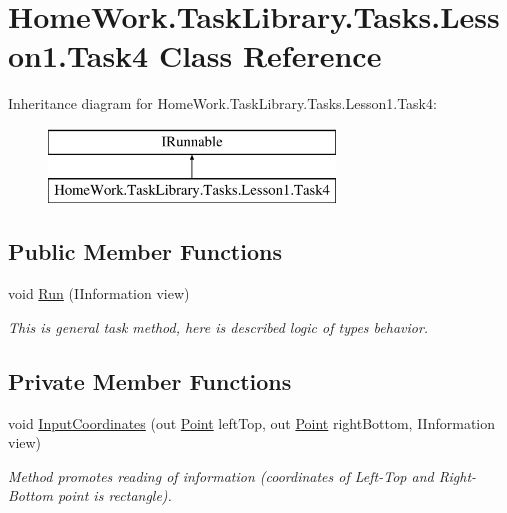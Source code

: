 \hypertarget{class_home_work_1_1_task_library_1_1_tasks_1_1_lesson1_1_1_task4}{}\section{Home\+Work.\+Task\+Library.\+Tasks.\+Lesson1.\+Task4 Class Reference}
\label{class_home_work_1_1_task_library_1_1_tasks_1_1_lesson1_1_1_task4}
Inheritance diagram for Home\+Work.\+Task\+Library.\+Tasks.\+Lesson1.\+Task4\+:\begin{figure}[H]
\begin{center}
\leavevmode
\includegraphics[height=2.000000cm]{class_home_work_1_1_task_library_1_1_tasks_1_1_lesson1_1_1_task4}
\end{center}
\end{figure}
\subsection*{Public Member Functions}
\begin{DoxyCompactItemize}
\item 
void \mbox{\hyperlink{class_home_work_1_1_task_library_1_1_tasks_1_1_lesson1_1_1_task4_aa0a3b8a5f4cf68d78553cf1c3bf80356}{Run}} (I\+Information view)
\begin{DoxyCompactList}\small\item\em This is general task method, here is described logic of types behavior. \end{DoxyCompactList}\end{DoxyCompactItemize}
\subsection*{Private Member Functions}
\begin{DoxyCompactItemize}
\item 
void \mbox{\hyperlink{class_home_work_1_1_task_library_1_1_tasks_1_1_lesson1_1_1_task4_a178973aac2a7e2976730b8d5c87a5790}{Input\+Coordinates}} (out \mbox{\hyperlink{struct_home_work_1_1_task_library_1_1_tasks_1_1_lesson1_1_1_classes_1_1_point}{Point}} left\+Top, out \mbox{\hyperlink{struct_home_work_1_1_task_library_1_1_tasks_1_1_lesson1_1_1_classes_1_1_point}{Point}} right\+Bottom, I\+Information view)
\begin{DoxyCompactList}\small\item\em Method promotes reading of information (coordinates of Left-\/\+Top and Right-\/\+Bottom point is rectangle). \end{DoxyCompactList}\end{DoxyCompactItemize}


